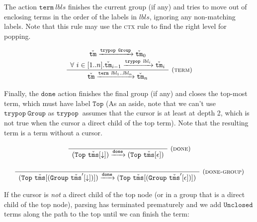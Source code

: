 \documentclass{article}
\newcommand{\rulename}{\textsc}
\newcommand{\rn}{\rulename}
\newcommand{\irule}[3]{\frac{\begin{array}{c}#2\end{array}}{\begin{array}{l}#3\end{array}}{~\small\mbox{(\rulename{#1})}}}
\newcommand{\labelFont}{\texttt}
\newcommand{\lbl}{\ensuremath{\mathit{lbl}}}
\newcommand{\lbls}{\ensuremath{\mathit{lbls}}}
\newcommand{\Top}{\ensuremath{\labelFont{Top}}}
\newcommand{\Group}{\ensuremath{\labelFont{Group}}}
\newcommand{\Unclosed}{\ensuremath{\labelFont{Unclosed}}}
\newcommand{\tm}{\ensuremath{\mathtt{tm}}}
\newcommand{\tms}{\ensuremath{\mathtt{tms}}}
\newcommand{\Tm}{\ensuremath{\check{\tm}}}
\newcommand{\Tms}{\ensuremath{\check{\tms}}}
\newcommand{\trypop}[1]{\ensuremath{\texttt{trypop}~#1}}
\newcommand{\term}[1]{\ensuremath{\texttt{term}~#1}}
\newcommand{\done}{\ensuremath{\texttt{done}}}
\newcommand{\cursor}{\ensuremath{\downarrow}}
\newcommand{\steps}[1]{\ensuremath{\xrightarrow{#1}}}
\begin{document}
The action \term{\lbls} finishes the current group (if any) and
tries to move out of enclosing terms in the order of the labels in
\lbls, ignoring any non-matching labels. Note that this rule may
use the \rn{ctx} rule to find the right level for popping.

\[
  \begin{array}{c}
    \irule{term}{
    \Tm \steps{\trypop{\Group}} \Tm_0\\
    \forall~i\in[1..n]. \Tm_{i-1} \steps{\trypop{\lbl_i}} \Tm_i
    }{
    \Tm \steps{\term{\lbl_1..\lbl_n}} \Tm_n
    }
  \end{array}
\]

Finally, the \done{} action finishes the final group (if any) and
closes the top-most term, which must have label \Top{} (As an aside,
note that we can't use \trypop{\Group} as \trypop{} assumes that
the cursor is at least at depth 2, which is not true when the
cursor a direct child of the top term). Note that the resulting
term is a term without a cursor.

\[
  \begin{array}{c}
    \irule{done}{}{
    (\Top~\Tms[\cursor]) \steps{\done} (\Top~\Tms[\epsilon])
    }
    \\\\
    \irule{done-group}{}{
    (\Top~\Tms[(\Group~\Tms'[\cursor])]) \steps{\done} (\Top~\Tms[(\Group~\Tms'[\epsilon])])
    }
  \end{array}
\]

If the cursor is \emph{not} a direct child of the top node (or in
a group that is a direct child of the top node), parsing has
terminated prematurely and we add \Unclosed{} terms along the path
to the top until we can finish the term:
\end{document}
